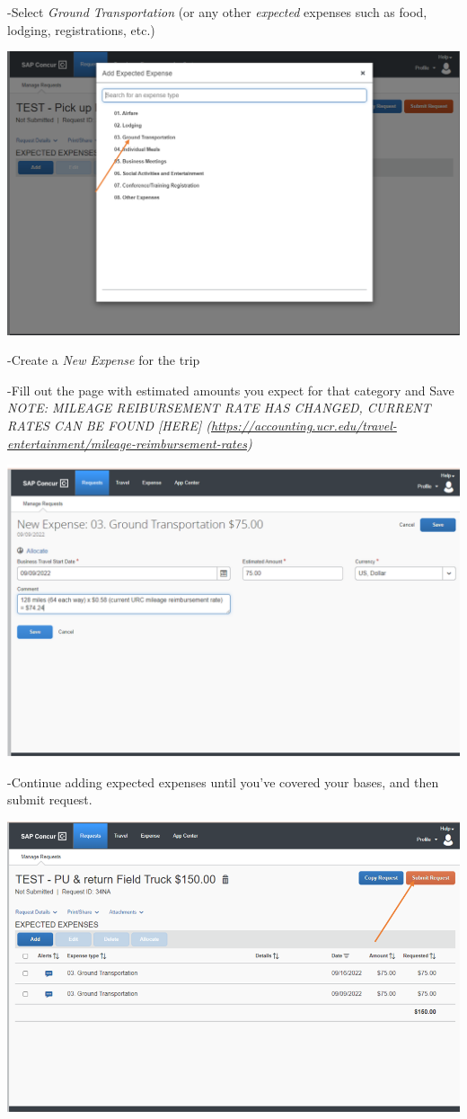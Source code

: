 \documentclass[
]{book}
\begin{document}
-Select \emph{Ground Transportation} (or any other \emph{expected} expenses such as food, lodging, registrations, etc.)

\begin{flushleft}\includegraphics[width=0.75\linewidth]{images/concur4} \end{flushleft}

-Create a \emph{New Expense} for the trip

-Fill out the page with estimated amounts you expect for that category and Save
\emph{NOTE: MILEAGE REIBURSEMENT RATE HAS CHANGED, CURRENT RATES CAN BE FOUND {[}HERE{]} (\url{https://accounting.ucr.edu/travel-entertainment/mileage-reimbursement-rates})}

\begin{flushleft}\includegraphics[width=0.75\linewidth]{images/concur5} \end{flushleft}

-Continue adding expected expenses until you've covered your bases, and then submit request.

\begin{flushleft}\includegraphics[width=0.75\linewidth]{images/concur6} \end{flushleft}
\end{document}
